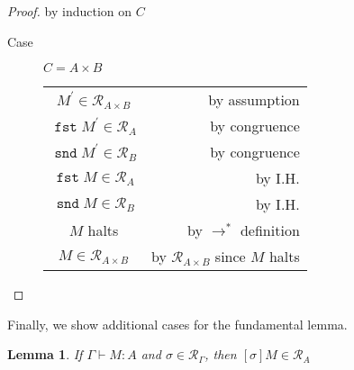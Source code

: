 \documentclass[letterpaper,11pt]{article}
\newtheorem{lemma}{Lemma}
\newcommand{\step}{\rightarrow}
\newcommand{\R}{\mathcal{R}}
\newcommand{\proves}{\vdash}
\DeclareMathOperator{\fst}{\mathtt{fst}}
\DeclareMathOperator{\snd}{\mathtt{snd}}
\begin{document}
\begin{proof} by induction on $C$

    \begin{description}
        \item[Case] $C = A \times B$

            \begin{center}
                \begin{tabular}{c r}
                    $M^\prime \in \R_{A \times B}$
                    &
                    by assumption \\
                    $\fst M^\prime \in \R_A$
                    &
                    by congruence \\
                    $\snd M^\prime \in \R_B$
                    &
                    by congruence \\
                    $\fst M \in \R_A$
                    &
                    by I.H. \\
                    $\snd M \in \R_B$
                    &
                    by I.H. \\
                    $M$ halts
                    &
                    by $\step^*$ definition \\
                    $M \in \R_{A \times B}$
                    &
                    by $\R_{A \times B}$ since $M$ halts
                \end{tabular}
            \end{center}
    \end{description}
\end{proof}

Finally, we show additional cases for the fundamental lemma.

\begin{lemma}
    If $\Gamma \proves M : A$ and $\sigma \in \R_\Gamma$,
    then $[\sigma]M \in \R_A$
\end{lemma}
\end{document}
